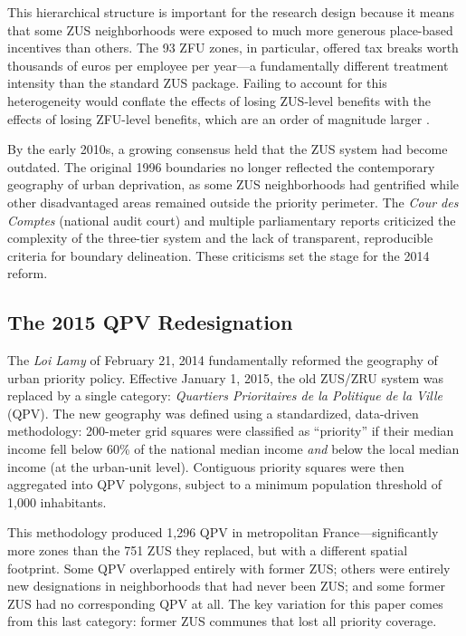 \documentclass[12pt]{article}
\begin{document}
This hierarchical structure is important for the research design because it means that some ZUS neighborhoods were exposed to much more generous place-based incentives than others. The 93 ZFU zones, in particular, offered tax breaks worth thousands of euros per employee per year---a fundamentally different treatment intensity than the standard ZUS package. Failing to account for this heterogeneity would conflate the effects of losing ZUS-level benefits with the effects of losing ZFU-level benefits, which are an order of magnitude larger \citep{mayer2017effects}.

By the early 2010s, a growing consensus held that the ZUS system had become outdated. The original 1996 boundaries no longer reflected the contemporary geography of urban deprivation, as some ZUS neighborhoods had gentrified while other disadvantaged areas remained outside the priority perimeter. The \textit{Cour des Comptes} (national audit court) and multiple parliamentary reports criticized the complexity of the three-tier system and the lack of transparent, reproducible criteria for boundary delineation. These criticisms set the stage for the 2014 reform.

\subsection{The 2015 QPV Redesignation}

The \textit{Loi Lamy} of February 21, 2014 fundamentally reformed the geography of urban priority policy. Effective January 1, 2015, the old ZUS/ZRU system was replaced by a single category: \textit{Quartiers Prioritaires de la Politique de la Ville} (QPV). The new geography was defined using a standardized, data-driven methodology: 200-meter grid squares were classified as ``priority'' if their median income fell below 60\% of the national median income \textit{and} below the local median income (at the urban-unit level). Contiguous priority squares were then aggregated into QPV polygons, subject to a minimum population threshold of 1,000 inhabitants.

This methodology produced 1,296 QPV in metropolitan France---significantly more zones than the 751 ZUS they replaced, but with a different spatial footprint. Some QPV overlapped entirely with former ZUS; others were entirely new designations in neighborhoods that had never been ZUS; and some former ZUS had no corresponding QPV at all. The key variation for this paper comes from this last category: former ZUS communes that lost all priority coverage.
\end{document}
